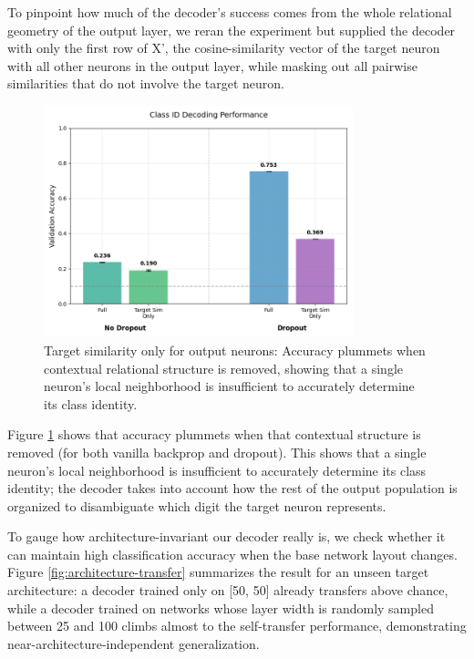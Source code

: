 \documentclass[11pt]{article}
\begin{document}
To pinpoint how much of the decoder's success comes from the whole relational geometry of the output layer, we reran the experiment but supplied the decoder with only the first row of X', the cosine-similarity vector of the target neuron with all other neurons in the output layer, while masking out all pairwise similarities that do not involve the target neuron.

\begin{figure}[htbp]
\centering
\includegraphics[width=0.8\textwidth]{figures/target-similarity-only-output-neurons.png}
\caption{Target similarity only for output neurons: Accuracy plummets when contextual relational structure is removed, showing that a single neuron's local neighborhood is insufficient to accurately determine its class identity.}
\label{fig:target-similarity-output}
\end{figure}

Figure \ref{fig:target-similarity-output} shows that accuracy plummets when that contextual structure is removed (for both vanilla backprop and dropout). This shows that a single neuron's local neighborhood is insufficient to accurately determine its class identity; the decoder takes into account how the rest of the output population is organized to disambiguate which digit the target neuron represents.

To gauge how architecture-invariant our decoder really is, we check whether it can maintain high classification accuracy when the base network layout changes. Figure \ref{fig:architecture-transfer} summarizes the result for an unseen target architecture: a decoder trained only on [50, 50] already transfers above chance, while a decoder trained on networks whose layer width is randomly sampled between 25 and 100 climbs almost to the self-transfer performance, demonstrating near-architecture-independent generalization.
\end{document}
